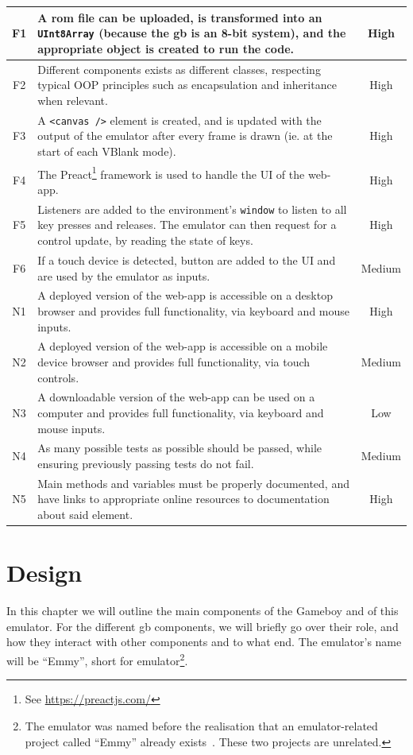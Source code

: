 \documentclass[11pt]{informatics-report}
\newcommand{\ftnt}[1]{\footnote{See \url{#1}}}
\begin{document}
\begin{xltabular}{\textwidth}{|c|X|c|}
    F1 & A \gls{rom} file can be uploaded, is transformed into an \texttt{UInt8Array} (because the \gls{gb} is an 8-bit system), and the appropriate object is created to run the code. & High \\ \hline
    F2 & Different components exists as different classes, respecting typical OOP principles such as encapsulation and inheritance when relevant. & High \\ \hline
    F3 & A \texttt{<canvas />} element is created, and is updated with the output of the emulator after every frame is drawn (ie. at the start of each VBlank mode). & High \\ \hline
    F4 & The Preact\ftnt{https://preactjs.com/} framework is used to handle the UI of the web-app. & High \\ \hline
    F5 & Listeners are added to the environment's \texttt{window} to listen to all key presses and releases. The emulator can then request for a control update, by reading the state of keys. & High \\ \hline
    F6 & If a touch device is detected, button are added to the UI and are used by the emulator as inputs. & Medium \\ \hline

    N1 & A deployed version of the web-app is accessible on a desktop browser and provides full functionality, via keyboard and mouse inputs. & High \\ \hline
    N2 & A deployed version of the web-app is accessible on a mobile device browser and provides full functionality, via touch controls. & Medium \\ \hline
    N3 & A downloadable version of the web-app can be used on a computer and provides full functionality, via keyboard and mouse inputs. & Low \\ \hline
    N4 & As many possible tests as possible should be passed, while ensuring previously passing tests do not fail. & Medium \\ \hline
    N5 & Main methods and variables must be properly documented, and have links to appropriate online resources to documentation about said element. & High \\ \hline
\end{xltabular}

\chapter{Design}

In this chapter we will outline the main components of the Gameboy and of this emulator. For the different \gls{gb} components, we will briefly go over their role, and how they interact with other components and to what end. The emulator's name will be ``Emmy'', short for emulator\footnote{The emulator was named before the realisation that an emulator-related project called ``Emmy'' already exists~\cite{emmy_stanford}. These two projects are unrelated.}.
\end{document}
